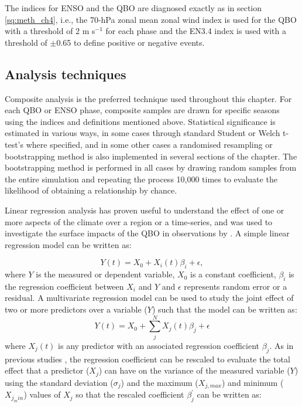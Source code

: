 The indices for ENSO and the QBO are diagnosed exactly as in section \ref{sq:meth_ch4}, i.e., the 70-hPa zonal mean zonal wind index is used for the QBO with a threshold of 2 m s$^{-1}$ for each phase and the EN3.4 index is used with a threshold of $\pm$0.65 to define positive or negative events.

\subsection{Analysis techniques}

Composite analysis is the preferred technique used throughout this chapter. For each QBO or ENSO phase, composite samples are drawn for specific seasons using the indices and definitions mentioned above. 
Statistical significance is estimated in various ways, in some cases through standard Student or Welch t-test's where specified, and in some other cases a randomised resampling or bootstrapping method is also implemented in several sections of the chapter. 
The bootstrapping method is performed in all cases by drawing random samples from the entire simulation and repeating the process 10,000 times to evaluate the likelihood of obtaining a relationship by chance. 

Linear regression analysis has proven useful to understand the effect of one or more aspects of the climate over a region or a time-series, and was used to investigate the surface impacts of the QBO in observations by \cite{gray2018}. 
A simple linear regression model can be written as:

\begin{equation}
Y(t)=X_0+X_i(t)\beta_i + \epsilon,
\end{equation}
\noindent where $Y$ is the measured or dependent variable, $X_0$ is a constant coefficient, $\beta_i$ is the regression coefficient between $X_i$ and $Y$ and $\epsilon$ represents random error or a residual. 
A multivariate regression model can be used to study the joint effect of two or more predictors over a variable ($Y$) such that the model can be written as:
\begin{equation}
Y(t)=X_0+\sum_j^NX_j(t)\beta_j+\epsilon
\end{equation}
\noindent where $X_j(t)$ is any predictor with an associated regression coefficient $\beta_j$. 
As in previous studies \citep{gray2018,misios2019slowdown}, the regression coefficient can be rescaled to evaluate the total effect that a predictor ($X_j$) can have on the variance of the measured variable ($Y$) using the standard deviation ($\sigma_j$) and the maximum ($X_{j,max}$) and minimum ($X_{j_min}$) values of $X_j$ so that the rescaled coefficient $\beta_j^\prime$ can be written as:

